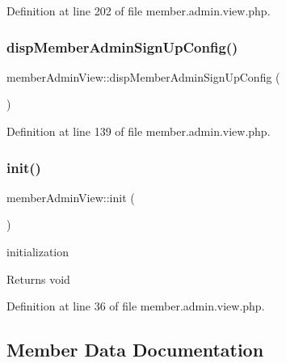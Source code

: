 Definition at line 202 of file member.\+admin.\+view.\+php.

\mbox{\label{classmemberAdminView_af3ab8ea3d555e7e685c6c4706e3ea545}} 
\subsubsection{\texorpdfstring{disp\+Member\+Admin\+Sign\+Up\+Config()}{dispMemberAdminSignUpConfig()}}
{\footnotesize\ttfamily member\+Admin\+View\+::disp\+Member\+Admin\+Sign\+Up\+Config (\begin{DoxyParamCaption}{ }\end{DoxyParamCaption})}



Definition at line 139 of file member.\+admin.\+view.\+php.

\mbox{\label{classmemberAdminView_abfcff5343cc06cfa70fa1994b8a77d05}} 
\subsubsection{\texorpdfstring{init()}{init()}}
{\footnotesize\ttfamily member\+Admin\+View\+::init (\begin{DoxyParamCaption}{ }\end{DoxyParamCaption})}

initialization

\begin{DoxyReturn}{Returns}
void 
\end{DoxyReturn}


Definition at line 36 of file member.\+admin.\+view.\+php.



\subsection{Member Data Documentation}
\mbox{\label{classmemberAdminView_a900a93ad7807c2f056b5055cf33f6be6}} 
